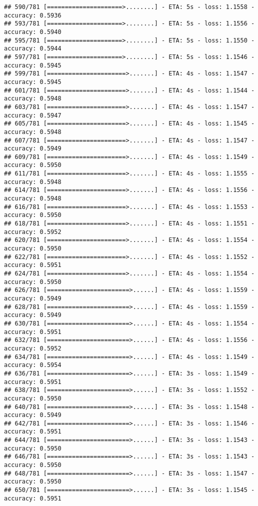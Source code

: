 \documentclass[
]{article}
\begin{document}
\begin{verbatim}
## 590/781 [=====================>........] - ETA: 5s - loss: 1.1558 - accuracy: 0.5936
## 593/781 [=====================>........] - ETA: 5s - loss: 1.1556 - accuracy: 0.5940
## 595/781 [=====================>........] - ETA: 5s - loss: 1.1550 - accuracy: 0.5944
## 597/781 [=====================>........] - ETA: 5s - loss: 1.1546 - accuracy: 0.5945
## 599/781 [======================>.......] - ETA: 4s - loss: 1.1547 - accuracy: 0.5945
## 601/781 [======================>.......] - ETA: 4s - loss: 1.1544 - accuracy: 0.5948
## 603/781 [======================>.......] - ETA: 4s - loss: 1.1547 - accuracy: 0.5947
## 605/781 [======================>.......] - ETA: 4s - loss: 1.1545 - accuracy: 0.5948
## 607/781 [======================>.......] - ETA: 4s - loss: 1.1547 - accuracy: 0.5949
## 609/781 [======================>.......] - ETA: 4s - loss: 1.1549 - accuracy: 0.5950
## 611/781 [======================>.......] - ETA: 4s - loss: 1.1555 - accuracy: 0.5948
## 614/781 [======================>.......] - ETA: 4s - loss: 1.1556 - accuracy: 0.5948
## 616/781 [======================>.......] - ETA: 4s - loss: 1.1553 - accuracy: 0.5950
## 618/781 [======================>.......] - ETA: 4s - loss: 1.1551 - accuracy: 0.5952
## 620/781 [======================>.......] - ETA: 4s - loss: 1.1554 - accuracy: 0.5950
## 622/781 [======================>.......] - ETA: 4s - loss: 1.1552 - accuracy: 0.5951
## 624/781 [======================>.......] - ETA: 4s - loss: 1.1554 - accuracy: 0.5950
## 626/781 [=======================>......] - ETA: 4s - loss: 1.1559 - accuracy: 0.5949
## 628/781 [=======================>......] - ETA: 4s - loss: 1.1559 - accuracy: 0.5949
## 630/781 [=======================>......] - ETA: 4s - loss: 1.1554 - accuracy: 0.5951
## 632/781 [=======================>......] - ETA: 4s - loss: 1.1556 - accuracy: 0.5952
## 634/781 [=======================>......] - ETA: 4s - loss: 1.1549 - accuracy: 0.5954
## 636/781 [=======================>......] - ETA: 3s - loss: 1.1549 - accuracy: 0.5951
## 638/781 [=======================>......] - ETA: 3s - loss: 1.1552 - accuracy: 0.5950
## 640/781 [=======================>......] - ETA: 3s - loss: 1.1548 - accuracy: 0.5949
## 642/781 [=======================>......] - ETA: 3s - loss: 1.1546 - accuracy: 0.5951
## 644/781 [=======================>......] - ETA: 3s - loss: 1.1543 - accuracy: 0.5950
## 646/781 [=======================>......] - ETA: 3s - loss: 1.1543 - accuracy: 0.5950
## 648/781 [=======================>......] - ETA: 3s - loss: 1.1547 - accuracy: 0.5950
## 650/781 [=======================>......] - ETA: 3s - loss: 1.1545 - accuracy: 0.5951

\end{verbatim}
\end{document}
